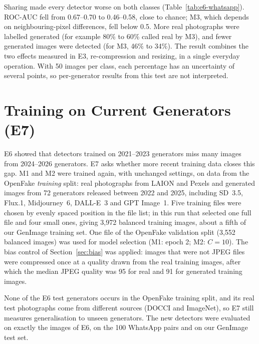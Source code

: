 \documentclass{mnnit}
\begin{document}
Sharing made every detector worse on both classes
(Table~\ref{tab:e6-whatsapp}). \mbox{ROC-AUC} fell from 0.67--0.70 to
0.46--0.58, close to chance; M3, which depends on neighbouring-pixel
differences, fell below 0.5. More real photographs were labelled
generated (for example 80\% to 60\% called real by M3), and fewer
generated images were detected (for M3, 46\% to 34\%). The result
combines the two effects measured in E3, re-compression and resizing,
in a single everyday operation. With 50 images per class, each
percentage has an uncertainty of several points, so per-generator
results from this test are not interpreted.

\section{Training on Current Generators (E7)}
E6 showed that detectors trained on 2021--2023 generators miss many
images from 2024--2026 generators. E7 asks whether more recent training
data closes this gap. M1 and M2 were trained again, with unchanged
settings, on data from the OpenFake \emph{training} split: real
photographs from LAION and Pexels and generated images from 72
generators released between 2022 and 2025, including SD~3.5, Flux.1,
Midjourney~6, DALL-E~3 and GPT Image~1. Five training files were chosen
by evenly spaced position in the file list; in this run that selected
one full file and four small ones, giving 3{,}972 balanced training
images, about a fifth of our GenImage training set. One file of the
OpenFake validation split (3{,}552 balanced images) was used for model
selection (M1: epoch 2; M2: $C = 10$). The bias control of
Section~\ref{sec:bias} was applied: images that were not JPEG files were
compressed once at a quality drawn from the real training images, after
which the median JPEG quality was 95 for real and 91 for generated
training images.

None of the E6 test generators occurs in the OpenFake training split, and
its real test photographs come from different sources (DOCCI and
ImageNet), so E7 still measures generalisation to unseen generators. The
new detectors were evaluated on exactly the images of E6, on the 100
WhatsApp pairs and on our GenImage test set.
\end{document}
